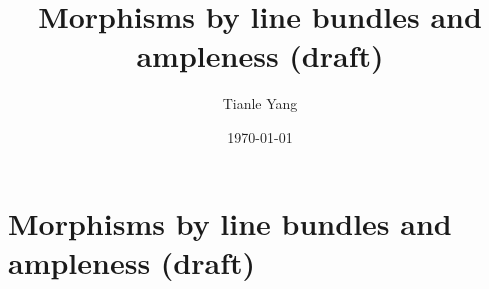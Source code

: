 \documentclass{noteformyself}
\title{Morphisms by line bundles and ampleness (draft)}
\author{Tianle Yang}
\date{\today}
\begin{document}
    \maketitle

    \section{Morphisms by line bundles and ampleness (draft)}


\end{document}
